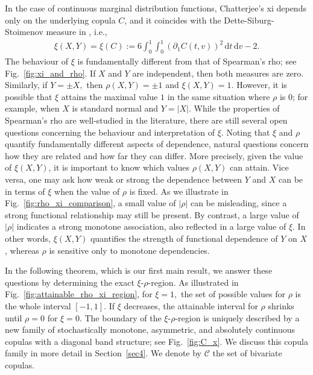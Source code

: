 \documentclass{article}
\theoremstyle{plain}
\theoremstyle{definition}
\newcommand{\de}{\mathrm{\,d}}
\begin{document}
In the case of continuous marginal distribution functions, Chatterjee's xi depends only on the underlying copula \(C\), and it coincides with the Dette-Siburg-Stoimenov measure in \cite{dette2013copula}, i.e.,
\begin{align}\label{repxicop}
   \xi(X,Y) = \xi(C) := 6 \int_0^1 \int_0^1 (\partial_1 C(t,v))^2 \de t \de v - 2.
\end{align}
The behaviour of \(\xi\) is fundamentally different from that of Spearman's rho; see Fig.~\ref{fig:xi_and_rho}. If \(X\) and \(Y\) are independent, then both measures are zero. 
Similarly, if \(Y = \pm X,\) then \(\rho(X,Y) = \pm 1\) and \(\xi(X,Y) = 1.\)
However, it is possible that \(\xi\) attains the maximal value \(1\) in the same situation where \(\rho\) is \(0\); for example, when \(X\) is standard normal and \(Y = |X|.\)
While the properties of Spearman's rho are well-studied in the literature, there are still several open questions concerning the behaviour and interpretation of \(\xi.\)
Noting that \(\xi\) and \(\rho\) quantify fundamentally different aspects of dependence, natural questions concern how they are related and how far they can differ.
More precisely, given the value of \(\xi(X,Y)\), it is important to know which values \(\rho(X,Y)\) can attain.
Vice versa, one may ask how weak or strong the dependence between \(Y\) and \(X\) can be in terms of \(\xi\) when the value of \(\rho\) is fixed.
As we illustrate in Fig.~\ref{fig:rho_xi_comparison}, a small value of \(|\rho|\) can be misleading, since a strong functional relationship may still be present.
By contrast, a large value of \(|\rho|\) indicates a strong monotone association, also reflected in a large value of \(\xi\).
In other words, \(\xi(X,Y)\) quantifies the strength of functional dependence of \(Y\) on \(X\) \cite[Theorem~1.1]{chatterjee2020}, whereas \(\rho\) is sensitive only to monotone dependencies.

In the following theorem, which is our first main result, we answer these questions by determining the exact \(\xi\)-\(\rho\)-region. As illustrated in Fig.~\ref{fig:attainable_rho_xi_region}, for \(\xi = 1,\) the set of possible values for \(\rho\) is the whole interval \([-1,1].\) If \(\xi\) decreases, the attainable interval for \(\rho\) shrinks until \(\rho = 0\) for \(\xi = 0.\) 
The boundary of the \(\xi\)-\(\rho\)-region is uniquely described by a new family of stochastically monotone, asymmetric, and absolutely continuous copulas with a diagonal band structure; see Fig.~\ref{fig:C_x}. We discuss this copula family in more detail in Section~\ref{sec4}. 
We denote by \(\mathcal{C}\) the set of bivariate copulas.
\end{document}

